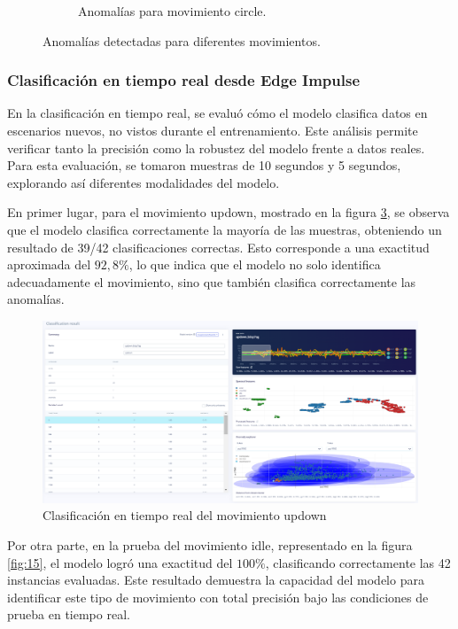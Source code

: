 \documentclass[12pt,a4paper]{article}
\begin{document}
\begin{itemize}
\begin{figure}[H]
\begin{subfigure}{0.31\textwidth}
        \caption{Anomalías para movimiento circle.}
        \label{fig:13}
    \end{subfigure}
    \caption{Anomalías detectadas para diferentes movimientos.}
    \label{fig:anomaly_detection}
\end{figure}
    
\end{itemize}

\subsubsection{Clasificación en tiempo real desde Edge Impulse}
En la clasificación en tiempo real, se evaluó cómo el modelo clasifica datos en escenarios nuevos, no vistos durante el entrenamiento. Este análisis permite verificar tanto la precisión como la robustez del modelo frente a datos reales. Para esta evaluación, se tomaron muestras de 10 segundos y 5 segundos, explorando así diferentes modalidades del modelo.

En primer lugar, para el movimiento updown, mostrado en la figura \ref{fig:14}, se observa que el modelo clasifica correctamente la mayoría de las muestras, obteniendo un resultado de 39/42 clasificaciones correctas. Esto corresponde a una exactitud aproximada del $92,8\%$, lo que indica que el modelo no solo identifica adecuadamente el movimiento, sino que también clasifica correctamente las anomalías.

\begin{figure}[H]
    \centering
    \includegraphics[width=0.8\linewidth]{Imagenes/live_updown.png}
    \caption{Clasificación en tiempo real del movimiento updown}
    \label{fig:14}
\end{figure}

Por otra parte, en la prueba del movimiento idle, representado en la figura \ref{fig:15}, el modelo logró una exactitud del $100\%$, clasificando correctamente las 42 instancias evaluadas. Este resultado demuestra la capacidad del modelo para identificar este tipo de movimiento con total precisión bajo las condiciones de prueba en tiempo real.
\end{document}

